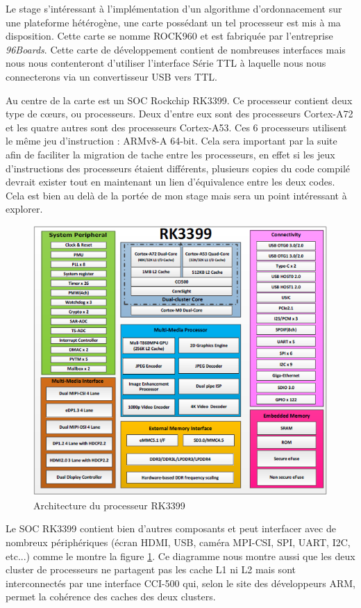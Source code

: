 Le stage s'intéressant à l'implémentation d'un algorithme d'ordonnacement sur une plateforme hétérogène, une carte possédant un tel processeur est mis à ma disposition. Cette carte se nomme ROCK960 et est fabriquée par l'entreprise \textit{96Boards}. Cette carte de développement contient de nombreuses interfaces mais nous nous contenteront d'utiliser l'interface Série TTL à laquelle nous nous connecterons via un convertisseur USB vers TTL.

Au centre de la carte est un \gls{SOC} Rockchip RK3399. Ce processeur contient deux type de cœurs, ou processeurs. Deux d'entre eux sont des processeurs Cortex-A72 et les quatre autres sont des processeurs Cortex-A53. Ces 6 processeurs utilisent le même jeu d'instruction : ARMv8-A 64-bit. Cela sera important par la suite afin de faciliter la migration de tache entre les processeurs, en effet si les jeux d'instructions des processeurs étaient différents, plusieurs copies du code compilé devrait exister tout en maintenant un lien d'équivalence entre les deux codes. Cela est bien au delà de la portée de mon stage mais sera un point intéressant à explorer.

\begin{figure}[H]
    \centering
    \includegraphics[width=0.45\paperwidth]{Images/RK3399_Block_Diagram.png}
    \caption{Architecture du processeur RK3399}
    \label{fig:archi_rk3399}
\end{figure}

Le SOC RK3399 contient bien d'autres composants et peut interfacer avec de nombreux périphériques (écran HDMI, USB, caméra MPI-CSI, SPI, UART, I2C, etc...) comme le montre la figure \ref{fig:archi_rk3399}. Ce diagramme nous montre aussi que les deux \gls{cluster} de processeurs ne partagent pas les cache L1 ni L2 mais sont interconnectés par une interface CCI-500 qui, selon le site des développeurs ARM, permet la cohérence des caches des deux clusters.